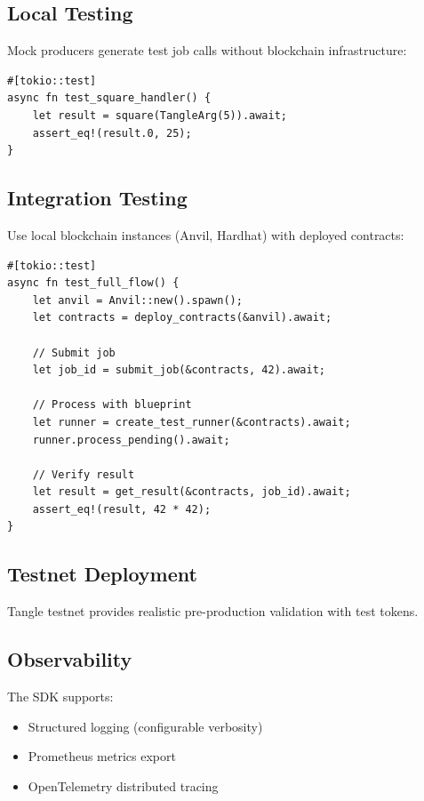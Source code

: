 \documentclass[11pt,a4paper]{article}
\begin{document}
\subsection{Local Testing}

Mock producers generate test job calls without blockchain infrastructure:
\begin{lstlisting}
#[tokio::test]
async fn test_square_handler() {
    let result = square(TangleArg(5)).await;
    assert_eq!(result.0, 25);
}
\end{lstlisting}

\subsection{Integration Testing}

Use local blockchain instances (Anvil, Hardhat) with deployed contracts:
\begin{lstlisting}
#[tokio::test]
async fn test_full_flow() {
    let anvil = Anvil::new().spawn();
    let contracts = deploy_contracts(&anvil).await;

    // Submit job
    let job_id = submit_job(&contracts, 42).await;

    // Process with blueprint
    let runner = create_test_runner(&contracts).await;
    runner.process_pending().await;

    // Verify result
    let result = get_result(&contracts, job_id).await;
    assert_eq!(result, 42 * 42);
}
\end{lstlisting}

\subsection{Testnet Deployment}

Tangle testnet provides realistic pre-production validation with test tokens.

\subsection{Observability}

The SDK supports:
\begin{itemize}[noitemsep]
    \item Structured logging (configurable verbosity)
    \item Prometheus metrics export
    \item OpenTelemetry distributed tracing
\end{itemize}
\end{document}
